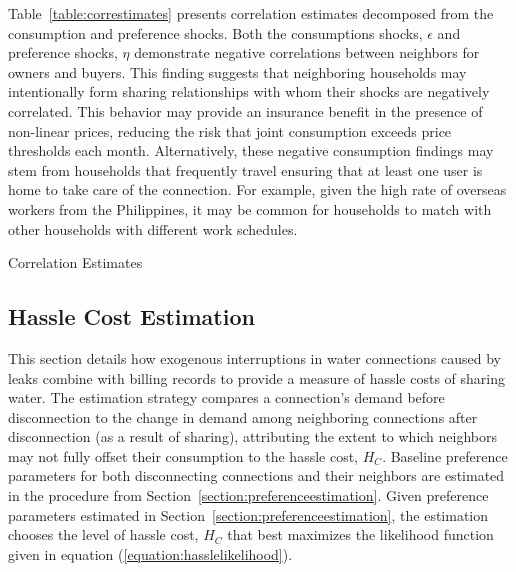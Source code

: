 \documentclass[12pt]{article}
\begin{document}
Table~\ref{table:correstimates} presents correlation estimates decomposed from the consumption and preference shocks.  Both the consumptions shocks, $\epsilon$ and preference shocks, $\eta$ demonstrate negative correlations between neighbors for owners and buyers.  This finding suggests that neighboring households may intentionally form sharing relationships with whom their shocks are negatively correlated.  This behavior may provide an insurance benefit in the presence of non-linear prices, reducing the risk that joint consumption exceeds price thresholds each month.  Alternatively, these negative consumption findings may stem from households that frequently travel ensuring that at least one user is home to take care of the connection.  For example, given the high rate of overseas workers from the Philippines, it may be common for households to match with other households with different work schedules.  

\begin{table}
\centering
\caption{Correlation Estimates}\label{table:correstimates}

\end{table}




\subsection{Hassle Cost Estimation}\label{section:hasslecostestimation}

This section details how exogenous interruptions in water connections caused by leaks combine with billing records to provide a measure of hassle costs of sharing water.  The estimation strategy compares a connection's demand before disconnection to the change in demand among neighboring connections after disconnection (as a result of sharing), attributing the extent to which neighbors may not fully offset their consumption to the hassle cost, $H_C$.  Baseline preference parameters for both disconnecting connections and their neighbors are estimated in the procedure from Section~\ref{section:preferenceestimation}.  Given preference parameters estimated in Section~\ref{section:preferenceestimation}, the estimation chooses the level of hassle cost, $H_C$ that best maximizes the likelihood function given in equation (\ref{equation:hasslelikelihood}).  
\end{document}
